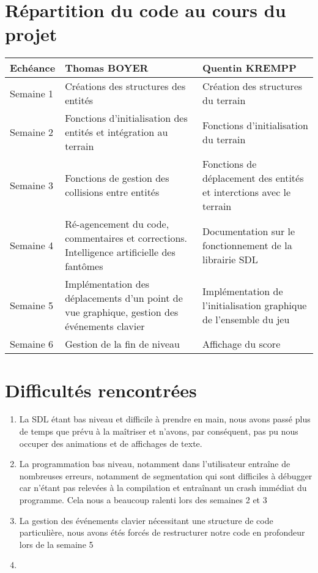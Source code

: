 \documentclass[a4paper,11pt]{article}
\begin{document}
\section{Répartition du code au cours du projet}

    \begin{tabular}{|l||p{125pt}|p{125pt}|}
        \hline
            Echéance & Thomas BOYER & Quentin KREMPP\\
        \hline
        \hline
            Semaine 1 & Créations des structures des entités & Création des structures du terrain\\
        \hline
            Semaine 2 & Fonctions d'initialisation des entités et intégration au terrain & Fonctions d'initialisation du terrain\\
        \hline
            Semaine 3 & Fonctions de gestion des collisions entre entités & Fonctions de déplacement des entités et interctions avec le terrain\\
        \hline
            Semaine 4 & Ré-agencement du code, commentaires et corrections. Intelligence artificielle des fantômes & Documentation sur le fonctionnement de la librairie SDL\\
        \hline
            Semaine 5 & Implémentation des déplacements d'un point de vue graphique, gestion des événements clavier & Implémentation de l'initialisation graphique de l'ensemble du jeu\\
        \hline
            Semaine 6 & Gestion de la fin de niveau & Affichage du score\\
        \hline
    \end{tabular}

\section{Difficultés rencontrées}

\begin{enumerate}
    \item La SDL étant bas niveau et difficile à prendre en main, nous avons passé plus de temps que prévu à la maîtriser et n'avons, par conséquent, pas pu nous occuper des animations et de affichages de texte.
    \item La programmation bas niveau, notamment dans l'utilisateur entraîne de nombreuses erreurs, notamment de segmentation qui sont difficiles à débugger car n'étant pas relevées à la compilation et entraînant un crash immédiat du programme. Cela nous a beaucoup ralenti lors des semaines 2 et 3
    \item La gestion des événements clavier nécessitant une structure de code particulière, nous avons étés forcés de restructurer notre code en profondeur lors de la semaine 5 
    \item 
\end{enumerate}
\end{document}
